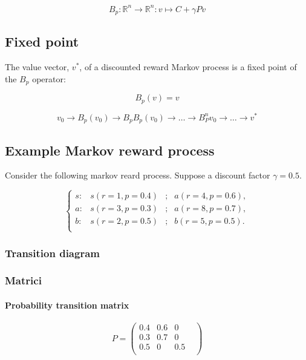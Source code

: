 \documentclass{article}
\begin{document}
\[B_p : \mathbb{R}^n \to \mathbb{R}^n : v \mapsto C + \gamma Pv \]

\subsection{Fixed point}
The value vector, $v^*$, of a discounted reward Markov process is a fixed
point of the $B_p$ operator:

\[ B_p(v)=v\]

\[
	v_0 \to B_p(v_0) \to B_p B_p (v_0) \to \dots \to B^n_P v_0
	\to \dots \to v^*
\]

\subsection{Example Markov reward process}
Consider the following markov reard process. Suppose a discount factor
$\gamma = 0.5$.

\[ \left\{ \begin{matrix}
		s: & s(r=1, p=0.4) & ; & a(r=4, p=0.6), \\
		a: & s(r=3, p=0.3) & ; & a(r=8, p=0.7), \\
		b: & s(r=2, p=0.5) & ; & b(r=5, p=0.5). \\
	\end{matrix}
\right. \]

\subsubsection{Transition diagram}
\subsubsection{Matrici}
\paragraph{Probability transition matrix}
\[
	P =
\begin{pmatrix}
	0.4	& 0.6 & 0 	& \\
	0.3	& 0.7 & 0	& \\
	0.5	& 0 & 0.5	& \\
\end{pmatrix}
\]
\end{document}
